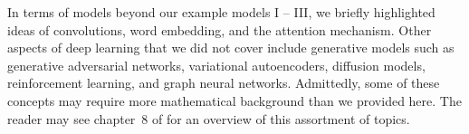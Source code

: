 \documentclass[12pt]{article}
\begin{document}
In terms of models beyond our example models I -- III, we briefly highlighted ideas of convolutions, word embedding, and the attention mechanism. Other aspects of deep learning that we did not cover include generative models such as generative adversarial networks, variational autoencoders, diffusion models, reinforcement learning, and graph neural networks. Admittedly, some of these concepts may require more mathematical background than we provided here. The reader may see chapter~8 of \cite{LiquetMokaNazarathy2024DeepLearning} for an overview of this assortment of topics. 



\end{document}
